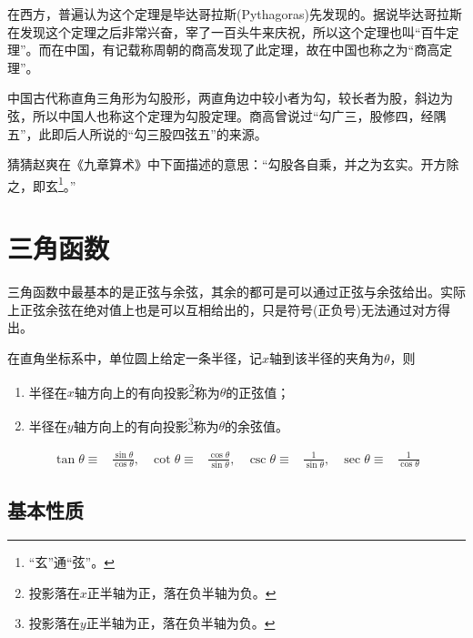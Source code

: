 在西方，普遍认为这个定理是毕达哥拉斯(Pythagoras)先发现的。据说毕达哥拉斯在发现这个定理之后非常兴奋，宰了一百头牛来庆祝，所以这个定理也叫“百牛定理”。而在中国，有记载称周朝的商高发现了此定理，故在中国也称之为“商高定理”。

中国古代称直角三角形为勾股形，两直角边中较小者为勾，较长者为股，斜边为弦，所以中国人也称这个定理为勾股定理。商高曾说过“勾广三，股修四，经隅五”，此即后人所说的“勾三股四弦五”的来源。

\begin{question}
  猜猜赵爽在《九章算术》中下面描述的意思：“勾股各自乘，并之为玄实。开方除之，即玄\footnote{“玄”通“弦”。}。”
\end{question}

\section{三角函数}
\label{sec:trigometric-functions}

三角函数中最基本的是正弦与余弦，其余的都可是可以通过正弦与余弦给出。实际上正弦余弦在绝对值上也是可以互相给出的，只是符号(正负号)无法通过对方得出。

\begin{definition}[正弦，余弦]
  在直角坐标系中，单位圆上给定一条半径，记$x$轴到该半径的夹角为$\theta$，则
  \begin{enumerate}
  \item 半径在$x$轴方向上的有向投影\footnote{投影落在$x$正半轴为正，落在负半轴为负。}称为$\theta$的正弦值；
  \item 半径在$y$轴方向上的有向投影\footnote{投影落在$y$正半轴为正，落在负半轴为负。}称为$\theta$的余弦值。
  \end{enumerate}
\end{definition}

\begin{definition}
  \begin{align*}
    \tan\theta\equiv{}&\frac{\sin\theta}{\cos\theta},& \cot\theta\equiv{}&\frac{\cos\theta}{\sin\theta}, &
    \csc\theta\equiv{}&\frac{1}{\sin\theta},         & \sec\theta\equiv{}&\frac{1}{\cos\theta}
  \end{align*}
\end{definition}

\subsection{基本性质}
\label{sec:basic-properties-of-trigonometric-functions}

